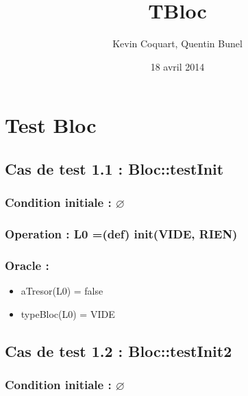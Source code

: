 \documentclass[11pt]{article}
\title{TBloc}
\author{Kevin Coquart, Quentin Bunel}
\date{18 avril 2014}
\begin{document}
\maketitle

\setcounter{tocdepth}{3}
\tableofcontents
\vspace*{1cm}
\section{Test Bloc}
\label{sec-1}


\subsection{Cas de test 1.1 : Bloc::testInit}
\label{sec-1.1}

\subsubsection{Condition initiale : $\varnothing$}
\label{sec-1.1.1}

\subsubsection{Operation : L0 =(def) init(VIDE, RIEN)}
\label{sec-1.1.2}

\subsubsection{Oracle :}
\label{sec-1.1.3}

\begin{itemize}

\item aTresor(L0) = false\\
\label{sec-1.1.3.1}


\item typeBloc(L0) = VIDE\\
\label{sec-1.1.3.2}



\end{itemize} %
\subsection{Cas de test 1.2 : Bloc::testInit2}
\label{sec-1.2}

\subsubsection{Condition initiale : $\varnothing$}
\label{sec-1.2.1}
\end{document}
